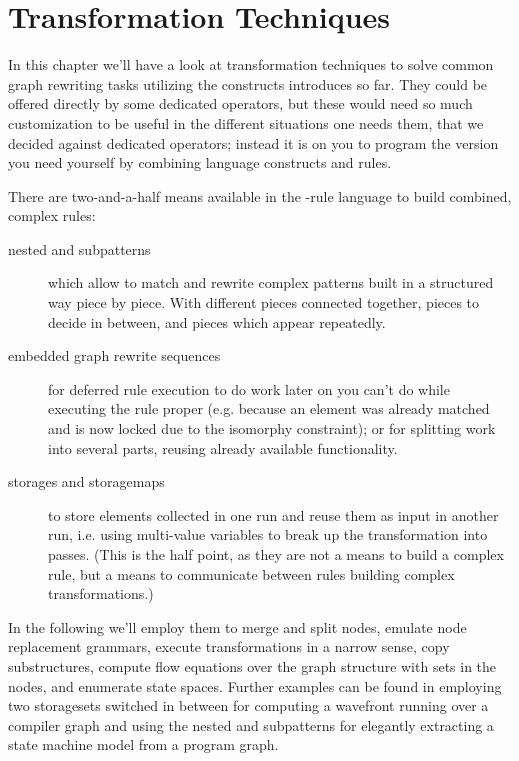 \chapter{Transformation Techniques}
\label{cha:techniques}
\label{sub:mergesplit}

In this chapter we'll have a look at transformation techniques to solve common graph rewriting tasks utilizing the constructs introduces so far.
They could be offered directly by some dedicated operators,
but these would need so much customization to be useful in the different situations one needs them,
that we decided against dedicated operators;
instead it is on you to program the version you need yourself by combining language constructs and rules.

There are two-and-a-half means available in the \GrG-rule language to build combined, complex rules:
\begin{description}
	\item[nested and subpatterns]
which allow to match and rewrite complex patterns built in a structured way piece by piece.
With different pieces connected together, pieces to decide in between, and pieces which appear repeatedly.
	\item[embedded graph rewrite sequences]
for deferred rule execution to do work later on you can't do while executing the rule proper (e.g. because an element was already matched and is now locked due to the isomorphy constraint); or for splitting work into several parts, reusing already available functionality.
	\item[storages and storagemaps]
to store elements collected in one run and reuse them as input in another run, i.e. using multi-value variables to break up the transformation into passes. (This is the half point, as they are not a means to build a complex rule, but a means to communicate between rules building complex transformations.)
\end{description}

\noindent In the following we'll employ them to merge and split nodes, emulate node replacement grammars, execute transformations in a narrow sense, copy substructures, compute flow equations over the graph structure with sets in the nodes, and enumerate state spaces.
Further examples can be found in \cite{CompilerOptimization} employing two storagesets switched in between for computing a wavefront running over a compiler graph and \cite{ProgramUnderstanding} using the nested and subpatterns for elegantly extracting a state machine model from a program graph.

